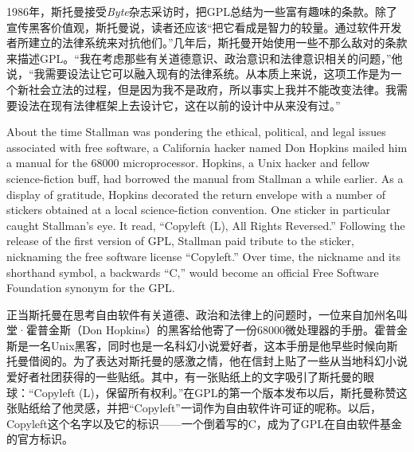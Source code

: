 \ifdefined\chs
1986年，斯托曼接受\textit{Byte}杂志采访时，把GPL总结为一些富有趣味的条款。除了宣传黑客价值观，斯托曼说，读者还应该``把它看成是智力的较量。通过软件开发者所建立的法律系统来对抗他们。''几年后，斯托曼开始使用一些不那么敌对的条款来描述GPL。``我在考虑那些有关道德意识、政治意识和法律意识相关的问题，''他说，``我需要设法让它可以融入现有的法律系统。从本质上来说，这项工作是为一个新社会立法的过程，但是因为我不是政府，所以事实上我并不能改变法律。我需要设法在现有法律框架上去设计它，这在以前的设计中从来没有过。''
\fi

\ifdefined\eng
About the time Stallman was pondering the ethical, political, and legal issues associated with free software, a California hacker named Don Hopkins mailed him a manual for the 68000 microprocessor. Hopkins, a Unix hacker and fellow science-fiction buff, had borrowed the manual from Stallman a while earlier. As a display of gratitude, Hopkins decorated the return envelope with a number of stickers obtained at a local science-fiction convention. One sticker in particular caught Stallman's eye. It read, ``Copyleft (L), All Rights Reversed.'' Following the release of the first version of GPL, Stallman paid tribute to the sticker, nicknaming the free software license ``Copyleft.'' Over time, the nickname and its shorthand symbol, a backwards ``C,'' would become an official Free Software Foundation synonym for the GPL.
\fi

\ifdefined\chs
正当斯托曼在思考自由软件有关道德、政治和法律上的问题时，一位来自加州名叫堂·霍普金斯（Don Hopkins）的黑客给他寄了一份68000微处理器的手册。霍普金斯是一名Unix黑客，同时也是一名科幻小说爱好者，这本手册是他早些时候向斯托曼借阅的。为了表达对斯托曼的感激之情，他在信封上贴了一些从当地科幻小说爱好者社团获得的一些贴纸。其中，有一张贴纸上的文字吸引了斯托曼的眼球：``Copyleft (L)，保留所有权利。''在GPL的第一个版本发布以后，斯托曼称赞这张贴纸给了他灵感，并把``Copyleft''一词作为自由软件许可证的呢称。以后，Copyleft这个名字以及它的标识——一个倒着写的C，成为了GPL在自由软件基金的官方标识。
\fi


